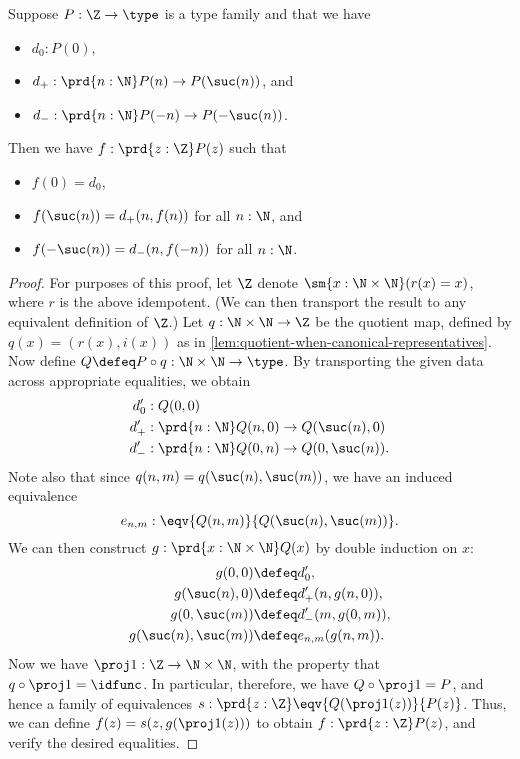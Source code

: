 \begin{lem}\label{thm:sign-induction}
  Suppose $P:\Z\to\type$ is a type family and that we have
  \begin{itemize}
  \item $d_0: P(0)$,
  \item $d_+: \prd{n:\N} P(n) \to P(\suc(n))$, and
  \item $d_- : \prd{n:\N} P(-n) \to P(-\suc(n))$.
  \end{itemize}
  Then we have $f:\prd{z:\Z} P(z)$ such that
  \begin{itemize}
    \item $f(0) = d_0$,
    \item $f(\suc(n)) = d_+(n,f(n))$ for all $n:\N$, and
    \item $f(-\suc(n)) = d_-(n,f(-n))$ for all $n:\N$.
  \end{itemize}
\end{lem}
\begin{proof}
  For purposes of this proof, let $\Z$ denote $\sm{x:\N\times\N}(r(x)=x)$, where $r$ is the above idempotent.
  (We can then transport the result to any equivalent definition of $\Z$.)
  Let $q:\N\times\N\to\Z$ be the quotient map, defined by $q(x) = (r(x),i(x))$ as in \cref{lem:quotient-when-canonical-representatives}.
  Now define $Q\defeq P\circ q:\N\times \N \to \type$.
  By transporting the given data across appropriate equalities, we obtain
  \begin{align*}
    d'_0 &: Q(0,0)\\
    d'_+ &: \prd{n:\N} Q(n,0) \to Q(\suc(n),0)\\
    d'_- &: \prd{n:\N} Q(0,n) \to Q(0,\suc(n)).
  \end{align*}
  Note also that since $q(n,m) = q(\suc(n),\suc(m))$, we have an induced equivalence
  \[e_{n,m}:\eqv{Q(n,m)}{Q(\suc(n),\suc(m))}.\]
  We can then construct $g:\prd{x:\N\times \N} Q(x)$ by double induction on $x$:
  \begin{align*}
    g(0,0) &\defeq d'_0,\\
    g(\suc(n),0) &\defeq d'_+(n,g(n,0)),\\
    g(0,\suc(m)) &\defeq d'_-(m,g(0,m)),\\
    g(\suc(n),\suc(m)) &\defeq e_{n,m}(g(n,m)).
  \end{align*}
  Now we have $\proj1 : \Z \to \N\times\N$, with the property that $q\circ \proj1 = \idfunc$.
  In particular, therefore, we have $Q\circ \proj1 = P$, and hence a family of equivalences $s:\prd{z:\Z} \eqv{Q(\proj1(z))}{P(z)}$.
  Thus, we can define $f(z) = s(z,g(\proj1(z)))$ to obtain $f:\prd{z:\Z} P(z)$, and verify the desired equalities.
\end{proof}

